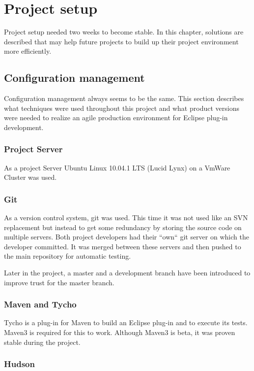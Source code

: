 \chapter{Project setup}
\thispagestyle{fancy}

Project setup needed two weeks to become stable. In this chapter, solutions are 
described that may help future projects to build up their project environment 
more efficiently.

\section{Configuration management}

Configuration management always seems to be the same. This section describes 
what techniques were used throughout this project and what product versions were 
needed to realize an agile production environment for Eclipse plug-in
development.

\subsection{Project Server}

As a project Server Ubuntu Linux 10.04.1 LTS (Lucid Lynx) on a VmWare Cluster
was used.

\subsection{Git}

As a version control system, git was used. This time it was not used like an SVN
replacement but instead to get some redundancy by storing the source code on
multiple servers. Both project developers had their ``own`` git server on which
the developer committed. It was merged between these servers and then pushed to
the main repository for automatic testing.

Later in the project, a master and a development branch have been introduced to 
improve trust for the master branch.

\subsection{Maven and Tycho}

Tycho is a plug-in for Maven to build an Eclipse plug-in and to execute its tests.
Maven3 is required for this to work. Although Maven3 is beta, it was proven
stable during the project.

\subsection{Hudson}

